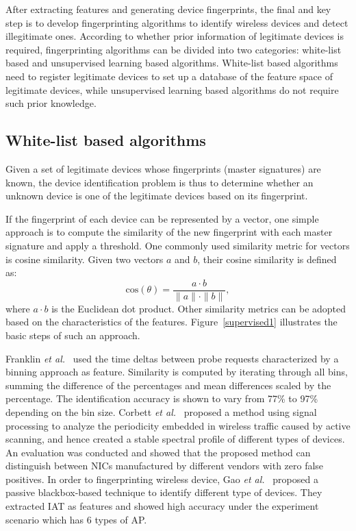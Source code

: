 \documentclass[journal,draftcls,onecolumn,11pt]{IEEEtran}
\newcounter{ctr}\setcounter{ctr}{0}
\begin{document}
After extracting features and generating device fingerprints, the final and key step is to develop fingerprinting algorithms to identify wireless devices and detect illegitimate ones.  According to whether prior information of legitimate devices is required, fingerprinting algorithms can be divided into two categories: white-list based  and unsupervised learning based algorithms.  White-list based algorithms need to register legitimate devices to set up a database of the feature space of legitimate devices, while unsupervised learning based algorithms do not require such prior knowledge.

\subsection{White-list based algorithms}

Given a set of legitimate devices whose fingerprints (master signatures) are known, the device identification problem is thus to determine whether an unknown device is one of the legitimate devices based on its fingerprint.

If the fingerprint of each device can be represented by a vector, one simple approach is to compute the similarity of the new fingerprint with each master signature and apply a threshold. One commonly used similarity metric for vectors is cosine similarity.  Given two vectors $a$ and $b$, their cosine similarity is defined as:
$$
\textrm{cos}(\theta) = \frac{a\cdot b}{\parallel a \parallel \cdot \parallel b \parallel},
$$
where $a\cdot b$ is the Euclidean dot product. Other similarity metrics can be adopted based on the characteristics of the features.  Figure~\ref{supervised1} illustrates the basic steps of such an approach.

Franklin {\it et al.}~\cite{Franklin} used the time deltas between probe requests characterized by a binning approach as feature. Similarity is computed by iterating through all bins, summing the difference of the percentages and mean differences scaled by the percentage. The identification accuracy is shown to vary from 77\% to 97\% depending on the bin size. Corbett \textit{et al.}~\cite{Corbett2008a} proposed a method using signal processing to analyze the periodicity embedded in wireless traffic caused by active scanning, and hence created a stable spectral profile of different types of devices. An evaluation was conducted and showed that the proposed method can distinguish between NICs manufactured by different vendors with zero false positives. In order to fingerprinting wireless device, Gao \textit{et al.}~\cite{Gao} proposed a passive blackbox-based technique to identify different type of devices. They extracted IAT as features and showed high accuracy under the experiment scenario which has 6 types of AP.
\end{document}

